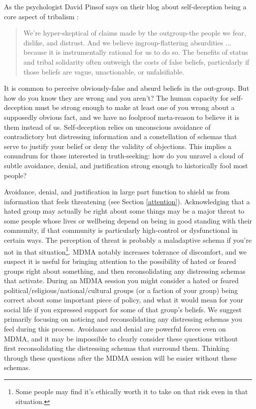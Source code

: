 \documentclass[12pt,letterpaper]{book}
\begin{document}
As the psychologist David Pinsof says on their blog about self-deception being a core aspect of tribalism \cite{pinsof2024Truth}:
\begin{quotation}
	We're hyper-skeptical of claims made by the outgroup-the people we fear, dislike, and distrust. And we believe ingroup-flattering absurdities ... because it is instrumentally rational for us to do so. The benefits of status and tribal solidarity often outweigh the costs of false beliefs, particularly if those beliefs are vague, unactionable, or unfalsifiable.
\end{quotation}

It is common to perceive obviously-false and absurd beliefs in the out-group. But how do you know they are wrong and you aren't? The human capacity for self-deception must be strong enough to make at least one of you wrong about a supposedly obvious fact, and we have no foolproof meta-reason to believe it is them instead of us. Self-deception relies on unconscious avoidance of contradictory but distressing information and a constellation of schemas that serve to justify your belief or deny the validity of objections. This implies a conundrum for those interested in truth-seeking: how do you unravel a cloud of subtle avoidance, denial, and justification strong enough to historically fool most people?

Avoidance, denial, and justification in large part function to shield us from information that feels threatening (see Section \ref{attention}). Acknowledging that a hated group may actually be right about some things may be a major threat to some people whose lives or wellbeing depend on being in good standing with their community, if that community is particularly high-control or dysfunctional in certain ways. The perception of threat is probably a maladaptive schema if you're not in that situation\footnote{Some people may find it's ethically worth it to take on that risk even in that situation.}. MDMA notably increases tolerance of discomfort, and we suspect it is useful for bringing attention to the possibility of hated or feared groups right about something, and then reconsolidating any distressing schemas that activate. During an MDMA session you might consider a hated or feared political/religious/national/cultural groups (or a faction of your group) being correct about some important piece of policy, and what it would mean for your social life if you expressed support for some of that group's beliefs. We suggest primarily focusing on noticing and reconsolidating any distressing schemas you feel during this process. Avoidance and denial are powerful forces even on MDMA, and it may be impossible to clearly consider these questions without first reconsolidating the distressing schemas that surround them. Thinking through these questions after the MDMA session will be easier without these schemas.
\end{document}
